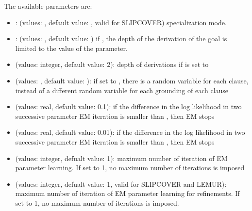 \documentclass[letterpaper,10pt,english]{sphinxmanual}
\begin{document}
\sphinxAtStartPar
The available parameters are:
\begin{itemize}
\item {} 
\sphinxAtStartPar
{}: (values: , default value: , valid for SLIPCOVER) specialization mode.

\item {} 
\sphinxAtStartPar
{}: (values: , default value: ) if , the depth of the derivation of the goal is limited to the value of the  parameter.

\item {} 
\sphinxAtStartPar
{} (values: integer, default value: 2): depth of derivations if  is set to 

\item {} 
\sphinxAtStartPar
{} (values: , default value: ): if set to , there is a random variable for each clause, instead of a different random variable for each grounding of each clause

\item {} 
\sphinxAtStartPar
{} (values: real, default value: 0.1): if the difference in the log likelihood in two successive parameter EM iteration is smaller than , then EM stops

\item {} 
\sphinxAtStartPar
{} (values: real, default value: 0.01): if the difference in the log likelihood in two successive parameter EM iteration is smaller than , then EM stops

\item {} 
\sphinxAtStartPar
{} (values: integer, defualt value: 1): maximum number of iteration of EM parameter learning. If set to \sphinxhyphen{}1, no maximum number of iterations is imposed

\item {} 
\sphinxAtStartPar
{} (values: integer, defualt value: 1, valid for SLIPCOVER and LEMUR): maximum number of iteration of EM parameter learning for refinements. If set to \sphinxhyphen{}1, no maximum number of iterations is imposed.


\end{itemize}
\end{document}
